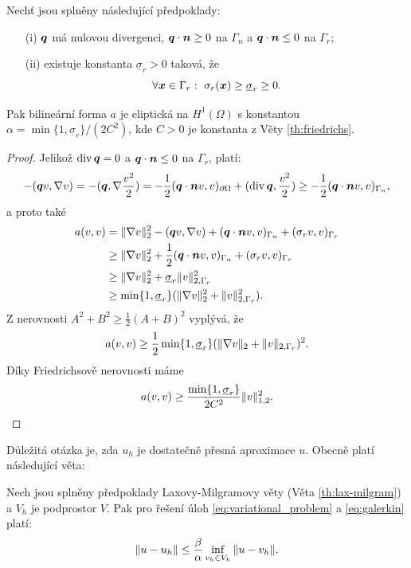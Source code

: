 \begin{veta}
Nechť jsou splněny následující předpoklady:
\begin{itemize}
\item[(i)] $\mathbf{\boldsymbol{q}}$ má nulovou divergenci, $\mathbf{\boldsymbol{q}}\cdot\mathbf{\boldsymbol{n}}\ge 0$ na $\Gamma_n$ a $\mathbf{\boldsymbol{q}}\cdot\mathbf{\boldsymbol{n}}\le 0$ na $\Gamma_r$;
\item[(ii)] existuje konstanta $\underline\sigma_r>0$ taková, že
\[ \forall\mathbf{\boldsymbol{x}}\in\Gamma_r:~\sigma_r(\mathbf{\boldsymbol{x}})\ge\underline\sigma_r\ge 0. \]
\end{itemize}
Pak bilineární forma $a$ je eliptická na $H^1(\Omega)$ s konstantou $\alpha=\min\{1,\underline\sigma_r\}/(2C^2)$, kde $C>0$ je konstanta z Věty \ref{th:friedrichs}.
\end{veta}
\begin{proof}
Jelikož $\operatorname{div}\mathbf{\boldsymbol{q}}=0$ a $\mathbf{\boldsymbol{q}}\cdot\mathbf{\boldsymbol{n}}\le 0$ na $\Gamma_r$, platí:
\[ -(\mathbf{\boldsymbol{q}} v,\nabla v) = -(\mathbf{\boldsymbol{q}},\nabla\frac{v^2}2) = -\frac12(\mathbf{\boldsymbol{q}}\cdot\mathbf{\boldsymbol{n}} v,v)_{\partial\Omega} +(\operatorname{div}\mathbf{\boldsymbol{q}},\frac{v^2}2) \ge -\frac12(\mathbf{\boldsymbol{q}}\cdot\mathbf{\boldsymbol{n}} v,v)_{\Gamma_n}, \]
a proto také
\begin{align*}
a(v,v) & = \|\nabla v\|_2^2 - (\mathbf{\boldsymbol{q}} v,\nabla v) + (\mathbf{\boldsymbol{q}}\cdot\mathbf{\boldsymbol{n}} v,v)_{\Gamma_n} + (\sigma_r v,v)_{\Gamma_r}\\
&\ge \|\nabla v\|_2^2 + \frac12 (\mathbf{\boldsymbol{q}}\cdot\mathbf{\boldsymbol{n}} v,v)_{\Gamma_n} + (\sigma_r v,v)_{\Gamma_r}\\
&\ge \|\nabla v\|_2^2 + \underline\sigma_r\|v\|_{2,\Gamma_r}^2\\
&\ge \min\{1,\underline\sigma_r\}(\|\nabla v\|_2^2 + \|v\|_{2,\Gamma_r}^2).
\end{align*}
Z nerovnosti $A^2+B^2\ge \frac12(A+B)^2$ vyplývá, že
\[ a(v,v) \ge \frac12\min\{1,\underline\sigma_r\}(\|\nabla v\|_2 + \|v\|_{2,\Gamma_r})^2. \]
Díky Friedrichsově nerovnosti máme
\[ a(v,v) \ge \frac{\min\{1,\underline\sigma_r\}}{2C^2}\| v\|_{1,2}^2. \]
\end{proof}









Důležitá otázka je, zda $u_h$ je dostatečně přesná aproximace $u$.
Obecně platí následující věta:
\begin{veta}\label{th:cea}
Nech jsou splněny předpoklady Laxovy-Milgramovy věty (Věta \ref{th:lax-milgram}) a $V_h$ je podprostor $V$.
Pak pro řešení úloh \eqref{eq:variational_problem} a \eqref{eq:galerkin} platí:
\begin{equation}\label{eq:cea}
\|u-u_h\|\le\frac\beta\alpha\inf_{v_h\in V_h} \|u-v_h\|.
\end{equation}
\end{veta}


